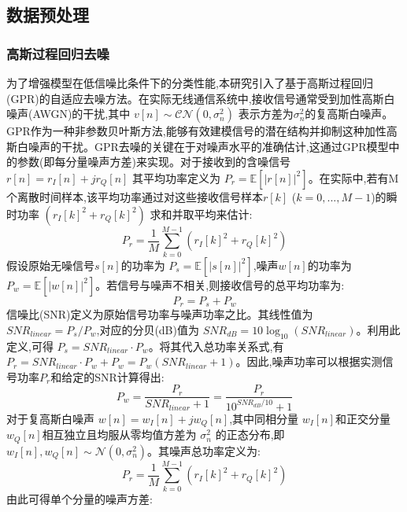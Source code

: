\documentclass{article}
\begin{document}
\begin{CJK}{UTF8}{gbsn}
\subsection{数据预处理}

\subsubsection{高斯过程回归去噪}
为了增强模型在低信噪比条件下的分类性能,本研究引入了基于高斯过程回归(GPR)的自适应去噪方法。在实际无线通信系统中,接收信号通常受到加性高斯白噪声(AWGN)的干扰,其中 $v[n]\sim\mathcal{CN}(0,\sigma_{n}^{2})$ 表示方差为$\sigma_{n}^{2}$的复高斯白噪声。GPR作为一种非参数贝叶斯方法,能够有效建模信号的潜在结构并抑制这种加性高斯白噪声的干扰。GPR去噪的关键在于对噪声水平的准确估计,这通过GPR模型中的参数(即每分量噪声方差)来实现。对于接收到的含噪信号 $r[n]=r_{I}[n]+jr_{Q}[n]$ 其平均功率定义为 $P_{r}=\mathbb{E}[|r[n]|^{2}]$。在实际中,若有M个离散时间样本,该平均功率通过对这些接收信号样本$r[k]$ ($k=0,...,M-1$)的瞬时功率 $(r_{I}[k]^{2}+r_{Q}[k]^{2})$ 求和并取平均来估计:
\begin{equation}
    P_{r}=\frac{1}{M}\sum_{k=0}^{M-1}(r_{I}[k]^{2}+r_{Q}[k]^{2})
    \label{eq:Pr}
\end{equation}
假设原始无噪信号$s[n]$的功率为 $P_{s}=\mathbb{E}[|s[n]|^{2}]$,噪声$w[n]$的功率为 $P_{w}=\mathbb{E}[|w[n]|^{2}]$。若信号与噪声不相关,则接收信号的总平均功率为:
\begin{equation}
    P_{r}=P_{s}+P_{w}
    \label{eq:Pr_sum}
\end{equation}
信噪比(SNR)定义为原始信号功率与噪声功率之比。其线性值为 $SNR_{linear}=P_{s}/P_{w}$,对应的分贝(dB)值为 $SNR_{dB}=10\log_{10}(SNR_{linear})$。利用此定义,可得 $P_{s}=SNR_{linear}\cdot P_{w}$。将其代入总功率关系式,有 $P_{r}=SNR_{linear}\cdot P_{w}+P_{w}=P_{w}(SNR_{linear}+1)$。因此,噪声功率可以根据实测信号功率$P_{r}$和给定的SNR计算得出:
\begin{equation}
    P_{w}=\frac{P_{r}}{SNR_{linear}+1}=\frac{P_{r}}{10^{SNR_{dB}/10}+1}
    \label{eq:Pw}
\end{equation}
对于复高斯白噪声 $w[n]=w_{I}[n]+jw_{Q}[n]$,其中同相分量 $w_{I}[n]$和正交分量 $w_{Q}[n]$相互独立且均服从零均值方差为 $\sigma_{n}^{2}$ 的正态分布,即 $w_{I}[n],w_{Q}[n]\sim\mathcal{N}(0,\sigma_{n}^{2})$。其噪声总功率定义为:
\begin{equation}
    P_{r}=\frac{1}{M}\sum_{k=0}^{M-1}(r_{I}[k]^{2}+r_{Q}[k]^{2})
    \label{eq:Pr_again}
\end{equation}
由此可得单个分量的噪声方差:
\begin{equation}

\end{equation}
\end{CJK}
\end{document}
